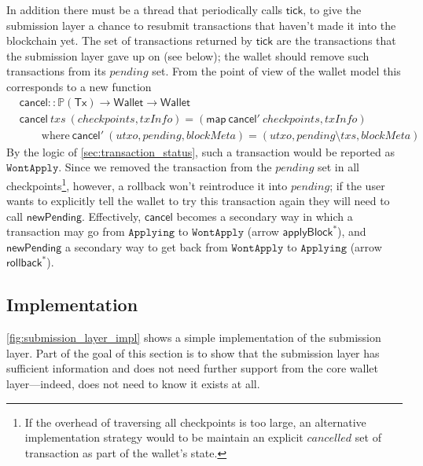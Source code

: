 \documentclass{article}
\theoremstyle{definition}{
  \newtheorem{lemma}{Lemma}[section] %
  \newtheorem{definition}[lemma]{Definition}
}
\theoremstyle{theorem}{
  \newtheorem{invariant}[lemma]{Invariant}
  \newtheorem{proofobligation}[lemma]{Proof Obligation}
}
\numberwithin{equation}{lemma}
\begin{document}
In addition there must be a thread that periodically calls $\mathsf{tick}$, to
give the submission layer a chance to resubmit transactions that haven't made it
into the blockchain yet. The set of transactions returned by $\mathsf{tick}$ are
the transactions that the submission layer gave up on (see below); the wallet
should remove such transactions from its $\mathit{pending}$ set. From the point
of view of the wallet model this corresponds to a new function
%
\begin{align*}
& \mathsf{cancel} :: \mathbb{P}(\mathsf{Tx}) \rightarrow \mathsf{Wallet} \rightarrow \mathsf{Wallet} \\
& \mathsf{cancel} ~ \mathit{txs} ~ (\mathit{checkpoints}, \mathit{txInfo}) = (\mathsf{map} ~ \mathsf{cancel'} ~ \mathit{checkpoints}, \mathit{txInfo}) \\
& \qquad \text{where} ~ \mathsf{cancel}' ~ (\mathit{utxo}, \mathit{pending}, \mathit{blockMeta}) = (\mathit{utxo}, \mathit{pending} \setminus \mathit{txs}, \mathit{blockMeta})
\end{align*}
%
By the logic of \cref{sec:transaction_status}, such a transaction would
be reported as $\mathtt{WontApply}$. Since we removed the transaction from the
$\mathit{pending}$ set in all checkpoints\footnote{If the overhead of traversing
all checkpoints is too large, an alternative implementation strategy would to be
maintain an explicit $\mathit{cancelled}$ set of transaction as part of the
wallet's state.}, however, a rollback won't reintroduce it into
$\mathit{pending}$; if the user wants to explicitly tell the wallet to try this
transaction again they will need to call $\mathsf{newPending}$. Effectively,
$\mathsf{cancel}$ becomes a secondary way in which a transaction may go from
$\texttt{Applying}$ to $\texttt{WontApply}$ (arrow $\mathsf{applyBlock}^*$), and
$\mathsf{newPending}$ a secondary way to get back from $\texttt{WontApply}$ to
$\texttt{Applying}$ (arrow $\mathsf{rollback}^*$).

\subsection{Implementation}
\label{sec:submission_implementation}

\cref{fig:submission_layer_impl} shows a simple implementation of the
submission layer.  Part of the goal of this section is to show that the
submission layer has sufficient information and does not need further support
from the core wallet layer---indeed, does not need to know it exists at all.
\end{document}

